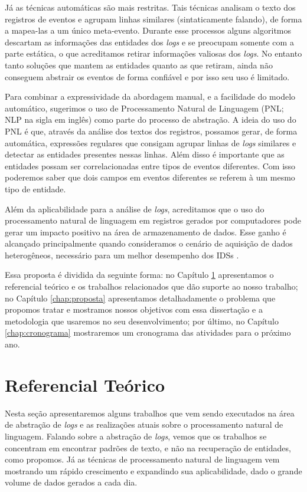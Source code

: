 \documentclass[
	12pt,				%
	openright,			%
	twoside,			%
	a4paper,			%
	english,			%
	spanish,			%
	brazil,				%
	]{abntex2}
\begin{document}
Já as técnicas automáticas são mais restritas. Tais técnicas analisam o texto dos registros de eventos e agrupam linhas similares (sintaticamente falando), de forma a mapea-las a um único meta-evento. Durante esse processos alguns algoritmos descartam as informações das entidades dos \emph{logs} e se preocupam somente com a parte estática, o que acreditamos retirar informações valiosas dos \emph{logs}. No entanto tanto soluções que mantem as entidades quanto as que retiram, ainda não conseguem abstrair os eventos de forma confiável e por isso seu uso é limitado.

Para combinar a expressividade da abordagem manual, e a facilidade do modelo automático, sugerimos o uso de Processamento Natural de Linguagem (PNL; NLP na sigla em inglês) como parte do processo de abstração. A ideia do uso do PNL é que, através da análise dos textos dos registros, possamos gerar, de forma automática, expressões regulares que consigam agrupar linhas de \emph{logs} similares e detectar as entidades presentes nessas linhas. Além disso é importante que as entidades possam ser correlacionadas entre tipos de eventos diferentes. Com isso poderemos saber que dois campos em eventos  diferentes se referem à um mesmo tipo de entidade.

Além da aplicabilidade para a análise de \emph{logs}, acreditamos que o uso do processamento natural de linguagem em registros gerados por computadores pode gerar um impacto positivo na área de armazenamento de dados. Esse ganho é alcançado principalmente quando consideramos o cenário de aquisição de dados heterogêneos, necessário para um melhor desempenho dos IDSs \cite{zuech2015intrusion}.

Essa proposta é dividida da seguinte forma: no Capítulo \ref{chap:referencial} apresentamos o referencial teórico e os trabalhos relacionados que dão suporte ao nosso trabalho; no Capítulo \ref{chap:proposta} apresentamos detalhadamente o problema que propomos tratar e mostramos nossos objetivos com essa dissertação e a metodologia que usaremos no seu desenvolvimento; por último, no Capítulo \ref{chap:cronograma} mostraremos um cronograma das atividades para o próximo ano.

\chapter{Referencial Teórico}\label{chap:referencial}

Nesta seção apresentaremos alguns trabalhos que vem sendo executados na área de abstração de \emph{logs} e as realizações atuais sobre o processamento natural de linguagem. Falando sobre a abstração de \emph{logs}, vemos que os trabalhos se concentram em encontrar padrões de texto, e não na recuperação de entidades, como propomos. Já as técnicas de processamento natural de linguagem vem mostrando um rápido crescimento e expandindo sua aplicabilidade, dado o grande volume de dados gerados a cada dia.
\end{document}
